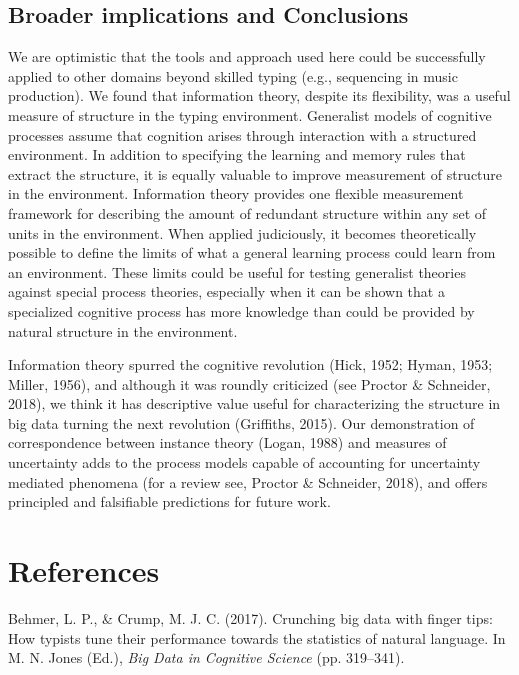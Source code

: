 \documentclass[,man,floatsintext]{apa6}
\begin{document}
\hypertarget{broader-implications-and-conclusions}{%
\subsection{Broader implications and Conclusions}\label{broader-implications-and-conclusions}}

We are optimistic that the tools and approach used here could be successfully applied to other domains beyond skilled typing (e.g., sequencing in music production). We found that information theory, despite its flexibility, was a useful measure of structure in the typing environment. Generalist models of cognitive processes assume that cognition arises through interaction with a structured environment. In addition to specifying the learning and memory rules that extract the structure, it is equally valuable to improve measurement of structure in the environment. Information theory provides one flexible measurement framework for describing the amount of redundant structure within any set of units in the environment. When applied judiciously, it becomes theoretically possible to define the limits of what a general learning process could learn from an environment. These limits could be useful for testing generalist theories against special process theories, especially when it can be shown that a specialized cognitive process has more knowledge than could be provided by natural structure in the environment.

Information theory spurred the cognitive revolution (Hick, 1952; Hyman, 1953; Miller, 1956), and although it was roundly criticized (see Proctor \& Schneider, 2018), we think it has descriptive value useful for characterizing the structure in big data turning the next revolution (Griffiths, 2015). Our demonstration of correspondence between instance theory (Logan, 1988) and measures of uncertainty adds to the process models capable of accounting for uncertainty mediated phenomena (for a review see, Proctor \& Schneider, 2018), and offers principled and falsifiable predictions for future work.

\newpage

\hypertarget{references}{%
\section{References}\label{references}}

\begingroup
\setlength{\parindent}{-0.5in}
\setlength{\leftskip}{0.5in}

\hypertarget{refs}{}
\leavevmode\hypertarget{ref-behmer_crunching_2017}{}%
Behmer, L. P., \& Crump, M. J. C. (2017). Crunching big data with finger tips: How typists tune their performance towards the statistics of natural language. In M. N. Jones (Ed.), \emph{Big Data in Cognitive Science} (pp. 319--341).
\end{document}

